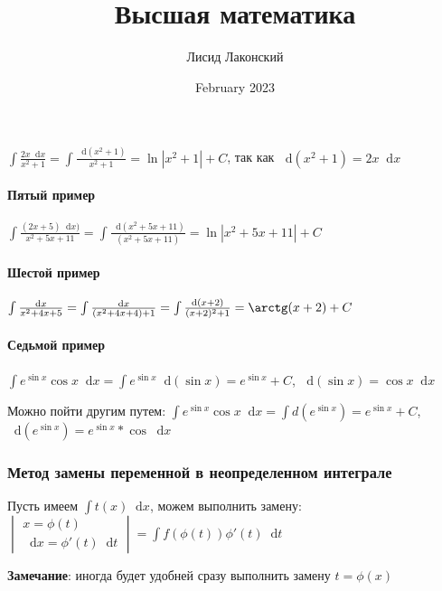 \documentclass{article}
\title{Высшая математика}
\author{Лисид Лаконский}
\date{February 2023}
\newcommand*\diff{\mathop{}\!\mathrm{d}}
\begin{document}
\raggedright

\maketitle

\tableofcontents
\pagebreak

$\int \frac{2 x \diff x}{x^2 + 1} = \int \frac{\diff (x^2 + 1)}{x^2 + 1} = \ln |x^2 + 1| + C$, так как $\diff (x^2 + 1) = 2 x \diff x$

\paragraph{Пятый пример}

$\int \frac{(2 x + 5) \diff x)}{x^2 + 5 x + 11} = \int \frac{\diff (x^2 + 5x + 11)}{(x^2 + 5x + 11)} = \ln |x^2 + 5x + 11| + C$

\paragraph{Шестой пример}

$\int \frac{\diff x}{x^2 + 4x + 5} = \int \frac{\diff x}{(x^2 + 4x + 4) + 1} = \int \frac{\diff (x + 2)}{(x + 2)^2 + 1} = \arctg (x + 2) + C$

\paragraph{Седьмой пример}

$\int e^{\sin x} \cos x \diff x = \int e^{\sin x} \diff (\sin x) = e^{\sin x} + C$, $\diff (\sin x) = \cos x \diff x$

Можно пойти другим путем: $\int e^{\sin x} \cos x \diff x = \int d (e^{\sin x}) = e^{\sin x} + C$, $\diff (e^{\sin x}) = e^{\sin x} * \cos \diff x$

\subsubsection{Метод замены переменной в неопределенном интеграле}

Пусть имеем $\int t(x) \diff x$, можем выполнить замену: $\begin{vmatrix}
    x = \phi (t) \\
    \diff x = \phi'(t) \diff t
\end{vmatrix} = \int f(\phi(t)) \phi'(t) \diff t$

\textbf{Замечание}: иногда будет удобней сразу выполнить замену $t = \phi(x)$
\end{document}
